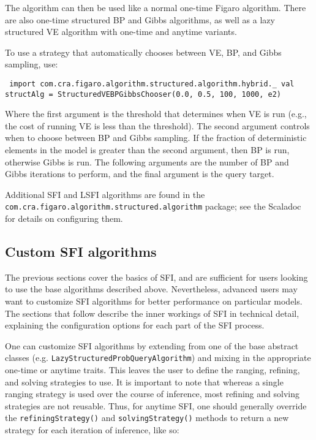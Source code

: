The algorithm can then be used like a normal one-time Figaro algorithm. There are also one-time structured BP and Gibbs algorithms, as well as a lazy structured VE algorithm with one-time and anytime variants.

To use a strategy that automatically chooses between VE, BP, and Gibbs sampling, use:

\begin{flushleft}
\texttt{
\newline import com.cra.figaro.algorithm.structured.algorithm.hybrid.\_
\newline val structAlg = StructuredVEBPGibbsChooser(0.0, 0.5, 100, 1000, e2)
}
\end{flushleft}

Where the first argument is the threshold that determines when VE is run (e.g., the cost of running VE is less than the threshold). The second argument controls when to choose between BP and Gibbs sampling. If the fraction of deterministic elements in the model is greater than the second argument, then BP is run, otherwise Gibbs is run. The following arguments are the number of BP and Gibbs iterations to perform, and the final argument is the query target.

Additional SFI and LSFI algorithms are found in the \texttt{com.cra.fig\-aro.algorithm.structured.algorithm} package; see the Scaladoc for details on configuring them.

\subsection{Custom SFI algorithms}

The previous sections cover the basics of SFI, and are sufficient for users looking to use the base algorithms described above. Nevertheless, advanced users may want to customize SFI algorithms for better performance on particular models. The sections that follow describe the inner workings of SFI in technical detail, explaining the configuration options for each part of the SFI process.

One can customize SFI algorithms by extending from one of the base abstract classes (e.g. \texttt{LazyStructuredProbQueryAlgorithm}) and mixing in the appropriate one-time or anytime traits. This leaves the user to define the ranging, refining, and solving strategies to use. It is important to note that whereas a single ranging strategy is used over the course of inference, most refining and solving strategies are not reusable. Thus, for anytime SFI, one should generally override the \texttt{refiningStrategy()} and \texttt{solvingStrategy()} methods to return a new strategy for each iteration of inference, like so:

